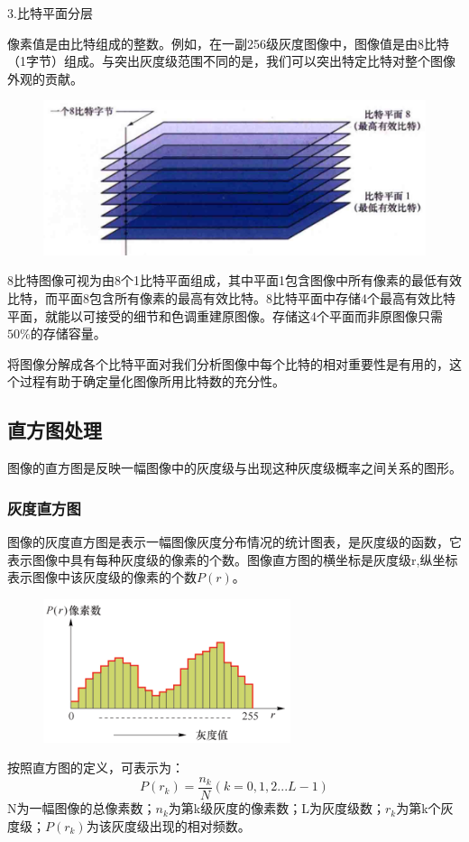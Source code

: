 \documentclass[11pt]{article}
\begin{document}
3.比特平面分层

像素值是由比特组成的整数。例如，在一副256级灰度图像中，图像值是由8比特（1字节）组成。与突出灰度级范围不同的是，我们可以突出特定比特对整个图像外观的贡献。

\begin{figure}[H]
	\centering
	\includegraphics[scale=0.6]{63}
\end{figure}
8比特图像可视为由8个1比特平面组成，其中平面1包含图像中所有像素的最低有效比特，而平面8包含所有像素的最高有效比特。8比特平面中存储4个最高有效比特平面，就能以可接受的细节和色调重建原图像。存储这4个平面而非原图像只需$50\%$的存储容量。

将图像分解成各个比特平面对我们分析图像中每个比特的相对重要性是有用的，这个过程有助于确定量化图像所用比特数的充分性。
\subsection{直方图处理}
图像的直方图是反映一幅图像中的灰度级与出现这种灰度级概率之间关系的图形。
\subsubsection{灰度直方图}
图像的灰度直方图是表示一幅图像灰度分布情况的统计图表，是灰度级的函数，它表示图像中具有每种灰度级的像素的个数。图像直方图的横坐标是灰度级r,纵坐标表示图像中该灰度级的像素的个数$P(r)$。
\begin{figure}[H]
	\centering
	\includegraphics[scale=0.7]{25}
\end{figure}

按照直方图的定义，可表示为：
$$P(r_k) = \frac{n_k}{N} (k=0,1,2...L-1)$$N为一幅图像的总像素数；$n_k$为第k级灰度的像素数；L为灰度级数；$r_k$为第k个灰度级；$P(r_k)$为该灰度级出现的相对频数。
\end{document}
